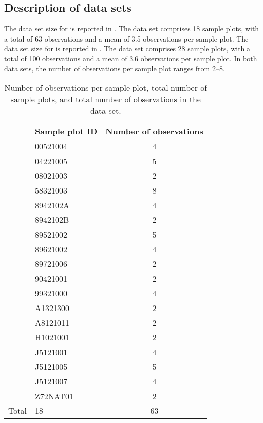 \subsection{Description of data sets}

The data set size for \Beech{} is reported in .  The data set comprises 18 sample plots, with a total of 63 observations and a mean of \num{3.5} observations per sample plot.  The data set size for \Spruce{} is reported in .  The data set comprises 28 sample plots, with a total of 100 observations and a mean of \num{3.6} observations per sample plot.  In both data sets, the number of observations per sample plot ranges from \numrange{2}{8}.

\newpage{}  %
\begin{singlespace}
  {\tabulinesep=2mm
    \begin{longtabu}{l L S[table-figures-decimal = 0]}
      \caption{Number of observations per sample plot, total number of sample plots, and total number of observations in the \Beech{} data set. \label{tab:ObservationsCountPerEdvidBeech}} \\
      \toprule
      & Sample plot ID & {Number of observations} \\
      \midrule
      \endhead
      \bottomrule
      \endlastfoot
      & 00521004 & 4 \\
      & 04221005 & 5 \\
      & 08021003 & 2 \\
      & 58321003 & 8 \\
      & 8942102A & 4 \\
      & 8942102B & 2 \\
      & 89521002 & 5 \\
      & 89621002 & 4 \\
      & 89721006 & 2 \\
      & 90421001 & 2 \\
      & 99321000 & 4 \\
      & A1321300 & 2 \\
      & A8121011 & 2 \\
      & H1021001 & 2 \\
      & J5121001 & 4 \\
      & J5121005 & 5 \\
      & J5121007 & 4 \\
      & Z72NAT01 & 2 \\
      Total & 18 & 63 \\
    \end{longtabu}
  }
\end{singlespace}

